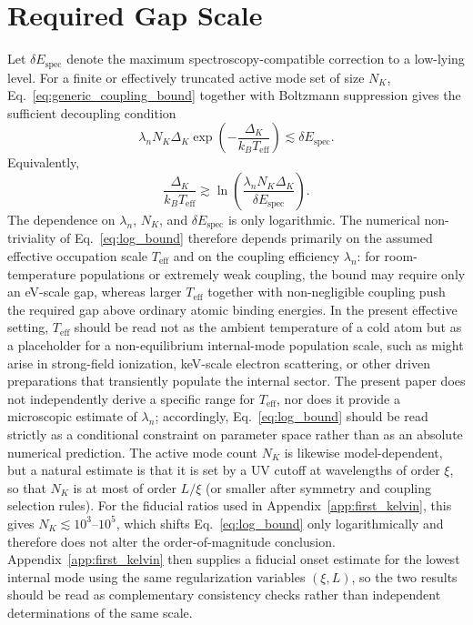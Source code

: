 \documentclass[pdflatex,sn-mathphys-num]{sn-jnl}
\begin{document}
    \section{Required Gap Scale}\label{sec:required_gap}
        Let $\delta E_{\mathrm{spec}}$ denote the maximum spectroscopy-compatible correction to a low-lying level. For a finite or effectively truncated active mode set of size $N_K$, Eq.~\eqref{eq:generic_coupling_bound} together with Boltzmann suppression gives the sufficient decoupling condition
        \begin{equation}
            \lambda_n N_K \Delta_K
            \exp\!\left(-\frac{\Delta_K}{k_B T_{\mathrm{eff}}}\right)
            \lesssim
            \delta E_{\mathrm{spec}}.
            \label{eq:general_bound}
        \end{equation}
        Equivalently,
        \begin{equation}
            \frac{\Delta_K}{k_B T_{\mathrm{eff}}}
            \gtrsim
            \ln\!\left(\frac{\lambda_n N_K \Delta_K}{\delta E_{\mathrm{spec}}}\right).
            \label{eq:log_bound}
        \end{equation}
        The dependence on $\lambda_n$, $N_K$, and $\delta E_{\mathrm{spec}}$ is only logarithmic. The numerical non-triviality of Eq.~\eqref{eq:log_bound} therefore depends primarily on the assumed effective occupation scale $T_{\mathrm{eff}}$ and on the coupling efficiency $\lambda_n$: for room-temperature populations or extremely weak coupling, the bound may require only an eV-scale gap, whereas larger $T_{\mathrm{eff}}$ together with non-negligible coupling push the required gap above ordinary atomic binding energies. In the present effective setting, $T_{\mathrm{eff}}$ should be read not as the ambient temperature of a cold atom but as a placeholder for a non-equilibrium internal-mode population scale, such as might arise in strong-field ionization, keV-scale electron scattering, or other driven preparations that transiently populate the internal sector. The present paper does not independently derive a specific range for $T_{\mathrm{eff}}$, nor does it provide a microscopic estimate of $\lambda_n$; accordingly, Eq.~\eqref{eq:log_bound} should be read strictly as a conditional constraint on parameter space rather than as an absolute numerical prediction. The active mode count $N_K$ is likewise model-dependent, but a natural estimate is that it is set by a UV cutoff at wavelengths of order $\xi$, so that $N_K$ is at most of order $L/\xi$ (or smaller after symmetry and coupling selection rules). For the fiducial ratios used in Appendix~\ref{app:first_kelvin}, this gives $N_K \lesssim 10^{3}\text{--}10^{5}$, which shifts Eq.~\eqref{eq:log_bound} only logarithmically and therefore does not alter the order-of-magnitude conclusion. Appendix~\ref{app:first_kelvin} then supplies a fiducial onset estimate for the lowest internal mode using the same regularization variables $(\xi,L)$, so the two results should be read as complementary consistency checks rather than independent determinations of the same scale.
\end{document}
